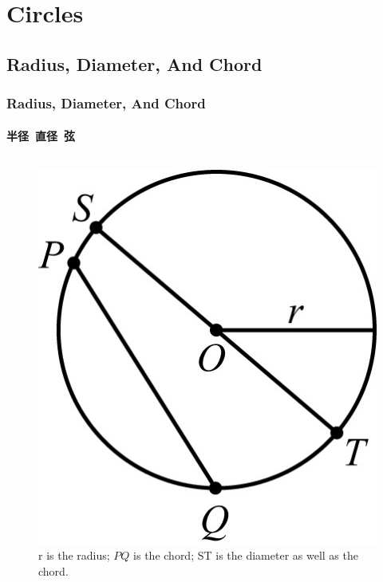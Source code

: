 \documentclass[
	11pt, %
]{beamer}
\begin{document}
\section{Circles}


\subsection{Radius, Diameter, And Chord}


\begin{frame}
	\frametitle{Radius, Diameter, And Chord} %
	\framesubtitle{半径\ 直径\ 弦}
			\begin{columns}[t] 
				\begin{column}{0.4\textwidth} %
					\begin{figure}
						\includegraphics[width=\linewidth]{Radius_Diameter_Chord.jpg}
						\caption{r is the radius; $PQ$ is the chord; ST is the diameter as well as the chord.}
					\end{figure}


\end{column}
\end{columns}
\end{frame}
\end{document}
